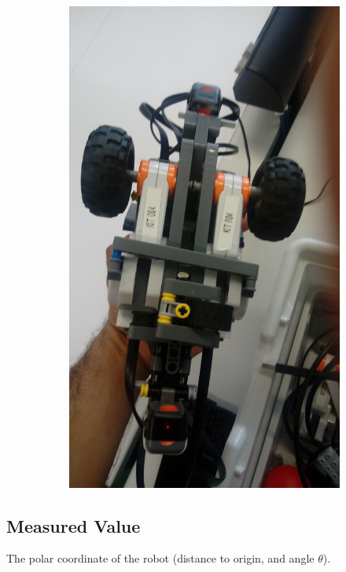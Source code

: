 \documentclass[10pt]{scrartcl}
\begin{document}
\begin{figure}[h!]
\begin{subfigure}[b]{0.4\textwidth}
    \includegraphics[width=\textwidth]{images/robot_2}
  \end{subfigure}
\end{figure}

\subsection*{Measured Value}
The polar coordinate of the robot (distance to origin, and angle $ \theta $).
\end{document}

